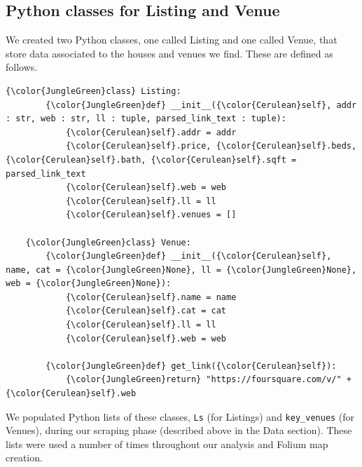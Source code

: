 \documentclass{article}
\begin{document}
\subsection{Python classes for Listing and Venue}
We created two Python classes, one called Listing and one called Venue, that store data associated to the houses and venues we find. These are defined as follows.
\begin{Verbatim}[commandchars=\\\{\}]
    {\color{JungleGreen}class} Listing:
        {\color{JungleGreen}def} __init__({\color{Cerulean}self}, addr : str, web : str, ll : tuple, parsed_link_text : tuple):
            {\color{Cerulean}self}.addr = addr
            {\color{Cerulean}self}.price, {\color{Cerulean}self}.beds, {\color{Cerulean}self}.bath, {\color{Cerulean}self}.sqft = parsed_link_text
            {\color{Cerulean}self}.web = web
            {\color{Cerulean}self}.ll = ll
            {\color{Cerulean}self}.venues = []

    {\color{JungleGreen}class} Venue:
        {\color{JungleGreen}def} __init__({\color{Cerulean}self}, name, cat = {\color{JungleGreen}None}, ll = {\color{JungleGreen}None}, web = {\color{JungleGreen}None}):
            {\color{Cerulean}self}.name = name
            {\color{Cerulean}self}.cat = cat
            {\color{Cerulean}self}.ll = ll
            {\color{Cerulean}self}.web = web
    
        {\color{JungleGreen}def} get_link({\color{Cerulean}self}):
            {\color{JungleGreen}return} "https://foursquare.com/v/" + {\color{Cerulean}self}.web
\end{Verbatim}
We populated Python lists of these classes, {\tt Ls} (for Listings) and {\tt key\_venues} (for Venues), during our scraping phase (described above in the Data section). These lists were used a number of times throughout our analysis and Folium map creation. 
\end{document}
